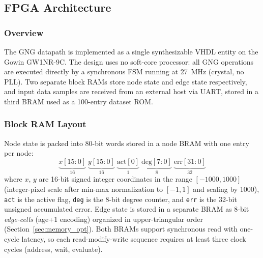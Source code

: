 \documentclass[conference]{IEEEtran}
\begin{document}
\subsection{FPGA Architecture}
\label{sec:arch}

\subsubsection{Overview}
The GNG datapath is implemented as a single synthesizable VHDL entity on the Gowin GW1NR-9C. The design uses no soft-core processor: all GNG operations are executed directly by a synchronous FSM running at 27~MHz (crystal, no PLL). Two separate block RAMs store node state and edge state respectively, and input data samples are received from an external host via UART, stored in a third BRAM used as a 100-entry dataset ROM.

\subsubsection{Block RAM Layout}
Node state is packed into 80-bit words stored in a node BRAM with one entry per node:
\[
\underbrace{x[15:0]}_{16}\; \underbrace{y[15:0]}_{16}\; \underbrace{\text{act}[0]}_{1}\; \underbrace{\text{deg}[7:0]}_{8}\; \underbrace{\text{err}[31:0]}_{32}
\]
where $x$, $y$ are 16-bit signed integer coordinates in the range $[-1000, 1000]$ (integer-pixel scale after min-max normalization to $[-1, 1]$ and scaling by 1000), \texttt{act} is the active flag, \texttt{deg} is the 8-bit degree counter, and \texttt{err} is the 32-bit unsigned accumulated error. Edge state is stored in a separate BRAM as 8-bit \emph{edge-cells} (age+1 encoding) organized in upper-triangular order (Section~\ref{sec:memory_opt}). Both BRAMs support synchronous read with one-cycle latency, so each read-modify-write sequence requires at least three clock cycles (address, wait, evaluate).
\end{document}
